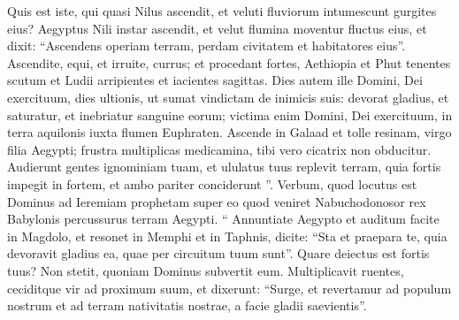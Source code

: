 \begin{biblechapter}
\begin{biblechapter}
\begin{biblechapter}
\begin{biblechapter}
\begin{biblechapter}
\begin{biblechapter}
\begin{biblechapter}
\begin{biblechapter}
\begin{biblechapter}
\begin{biblechapter}
\begin{biblechapter}
\begin{biblechapter}
\begin{biblechapter}
\begin{biblechapter}
\begin{biblechapter}
\begin{biblechapter}
\begin{biblechapter}
\begin{biblechapter}
\begin{biblechapter}
\begin{biblechapter}
\begin{biblechapter}
\begin{biblechapter}
\begin{biblechapter}
\begin{biblechapter}
\begin{biblechapter}
\begin{biblechapter}
\begin{biblechapter}
\begin{biblechapter}
\begin{biblechapter}
\begin{biblechapter}
\begin{biblechapter}
\begin{biblechapter}
\begin{biblechapter}
\begin{biblechapter}
\begin{biblechapter}
\begin{biblechapter}
\begin{biblechapter}
\begin{biblechapter}
\begin{biblechapter}
\begin{biblechapter}
\begin{biblechapter}
\begin{biblechapter}
\begin{biblechapter}
\begin{biblechapter}
\begin{biblechapter}
\begin{biblechapter}
 \verse Quis est iste, qui quasi Nilus ascendit,
 et veluti fluviorum intumescunt gurgites eius?
 \verse Aegyptus Nili instar ascendit,
 et velut flumina moventur fluctus eius,
 et dixit: “Ascendens operiam terram,
 perdam civitatem et habitatores eius”.
 \verse Ascendite, equi, et irruite, currus;
 et procedant fortes,
 Aethiopia et Phut tenentes scutum et Ludii arripientes et iacientes sagittas.
 \verse Dies autem ille Domini, Dei exercituum, dies ultionis,
 ut sumat vindictam de inimicis suis: devorat gladius, et saturatur,
 et inebriatur sanguine eorum;
 victima enim Domini, Dei exercituum,
 in terra aquilonis iuxta flumen Euphraten.
 \verse Ascende in Galaad et tolle resinam,
 virgo filia Aegypti;
 frustra multiplicas medicamina,
 tibi vero cicatrix non obducitur.
 \verse Audierunt gentes ignominiam tuam, et ululatus tuus replevit terram,
 quia fortis impegit in fortem,
 et ambo pariter conciderunt ”.
 \verse Verbum, quod locutus est Dominus ad Ieremiam prophetam super eo quod veniret Nabuchodonosor rex Babylonis percussurus terram Aegypti.
 \verse “ Annuntiate Aegypto
 et auditum facite in Magdolo,
 et resonet in Memphi et in Taphnis,
 dicite: “Sta et praepara te,
 quia devoravit gladius ea,
 quae per circuitum tuum sunt”.
 \verse Quare deiectus est fortis tuus?
 Non stetit, quoniam Dominus subvertit eum.
 \verse Multiplicavit ruentes,
 ceciditque vir ad proximum suum, et dixerunt: “Surge,
 et revertamur ad populum nostrum
 et ad terram nativitatis nostrae,
 a facie gladii saevientis”.

\end{biblechapter}
\end{biblechapter}
\end{biblechapter}
\end{biblechapter}
\end{biblechapter}
\end{biblechapter}
\end{biblechapter}
\end{biblechapter}
\end{biblechapter}
\end{biblechapter}
\end{biblechapter}
\end{biblechapter}
\end{biblechapter}
\end{biblechapter}
\end{biblechapter}
\end{biblechapter}
\end{biblechapter}
\end{biblechapter}
\end{biblechapter}
\end{biblechapter}
\end{biblechapter}
\end{biblechapter}
\end{biblechapter}
\end{biblechapter}
\end{biblechapter}
\end{biblechapter}
\end{biblechapter}
\end{biblechapter}
\end{biblechapter}
\end{biblechapter}
\end{biblechapter}
\end{biblechapter}
\end{biblechapter}
\end{biblechapter}
\end{biblechapter}
\end{biblechapter}
\end{biblechapter}
\end{biblechapter}
\end{biblechapter}
\end{biblechapter}
\end{biblechapter}
\end{biblechapter}
\end{biblechapter}
\end{biblechapter}
\end{biblechapter}
\end{biblechapter}
